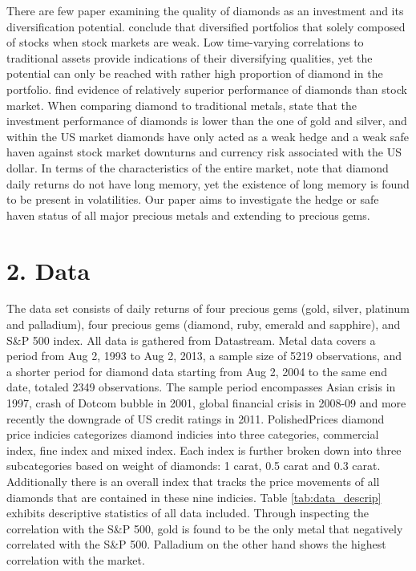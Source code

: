 \documentclass[preprint,authoryear,11pt]{elsarticle}
\begin{document}
\newline\newline
\noindent There are few paper examining the quality of diamonds as an investment and its diversification potential. \citet{auer_diamonds_2013} conclude that diversified portfolios that solely composed of stocks when stock markets are weak. Low time-varying correlations to traditional assets provide indications of their diversifying qualities, yet the potential can only be reached with rather high proportion of diamond in the portfolio. \citet{renneboog_hard_2012} find evidence of relatively superior performance of diamonds than stock market. When comparing diamond to traditional metals, \citet{auer_could_2014} state that the investment performance of diamonds is lower than the one of gold and silver, and within the US market diamonds have only acted as a weak hedge and a weak safe haven against stock market downturns and currency risk associated with the US dollar. In terms of the characteristics of the entire market, \citet{chong_long-range_2012} note that diamond daily returns do not have long memory, yet the existence of long memory is found to be present in volatilities. 
\newline\newline
\noindent Our paper aims to investigate the hedge or safe haven status of all major precious metals and extending to precious gems.


\section{2. Data}
\label{sec:data}
\noindent The data set consists of daily returns of four precious gems (gold, silver, platinum and palladium), four precious gems (diamond, ruby, emerald and sapphire), and S\&P 500 index. All data is gathered from Datastream. Metal data covers a period from Aug 2, 1993 to Aug 2, 2013, a sample size of 5219 observations, and a shorter period for diamond data starting from Aug 2, 2004 to the same end date, totaled 2349 observations. The sample period encompasses Asian crisis in 1997, crash of Dotcom bubble in 2001, global financial crisis in 2008-09 and more recently the downgrade of US credit ratings in 2011. PolishedPrices diamond price indicies categorizes diamond indicies into three categories, commercial index, fine index and mixed index. Each index is further broken down into three subcategories based on weight of diamonds: 1 carat, 0.5 carat and 0.3 carat. Additionally there is an overall index that tracks the price movements of all diamonds that are contained in these nine indicies. Table \ref{tab:data_descrip}  exhibits descriptive statistics of all data included. Through inspecting the correlation with the S\&P 500, gold is found to be the only metal that negatively correlated with the S\&P 500. Palladium on the other hand shows the highest correlation with the market. 
\end{document}
